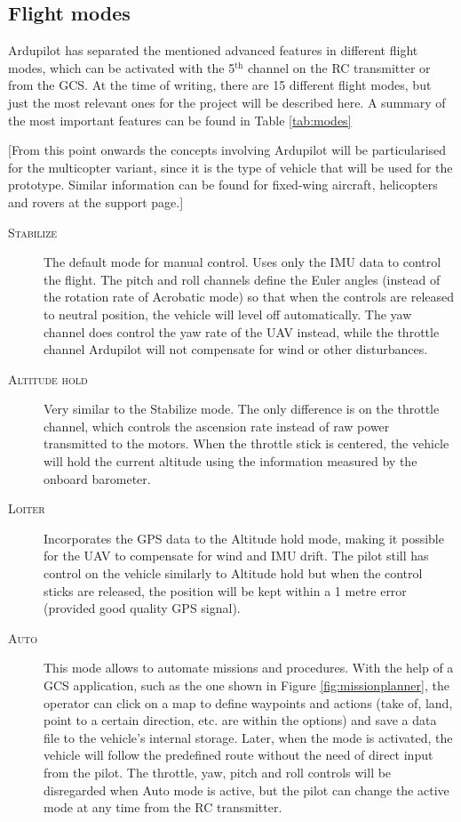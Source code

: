 \subsection{Flight modes}

Ardupilot has separated the mentioned advanced features in different flight modes, which can be activated with the 5$^{\text{th}}$ channel on the RC transmitter or from the GCS.
At the time of writing, there are 15 different flight modes, but just the most relevant ones for the project will be described here.
A summary of the most important features can be found in Table \ref{tab:modes}

\noindent \small{[From this point onwards the concepts involving Ardupilot will be particularised for the multicopter variant, since it is the type of vehicle that will be used for the prototype.
Similar information can be found for fixed-wing aircraft, helicopters and rovers at the support page.]

\begin{description}

	\item[\scshape Stabilize] 
		The default mode for manual control.
		Uses only the IMU data to control the flight.
		The pitch and roll channels define the Euler angles (instead of the rotation rate of Acrobatic mode) so that when the controls are released to neutral position, the vehicle will level off automatically.
		The yaw channel does control the yaw rate of the UAV instead, while the throttle channel
		Ardupilot will not compensate for wind or other disturbances.

	\item[\scshape Altitude hold]
		Very similar to the Stabilize mode.
		The only difference is on the throttle channel, which controls the ascension rate instead of raw power transmitted to the motors.
		When the throttle stick is centered, the vehicle will hold the current altitude using the information measured by the onboard barometer.

	\item[\scshape Loiter]
		Incorporates the GPS data to the Altitude hold mode, making it possible for the UAV to compensate for wind and IMU drift.
		The pilot still has control on the vehicle similarly to Altitude hold but when the control sticks are released, the position will be kept within a 1 metre error (provided good quality GPS signal).

	\item[\scshape Auto]
		This mode allows to automate missions and procedures.
		With the help of a GCS application, such as the one shown in Figure \ref{fig:missionplanner}, the operator can click on a map to define waypoints and actions (take of, land, point to a certain direction, etc. are within the options) and save a data file to the vehicle's internal storage.
		Later, when the mode is activated, the vehicle will follow the predefined route without the need of direct input from the pilot.
		The throttle, yaw, pitch and roll controls will be disregarded when Auto mode is active, but the pilot can change the active mode at any time from the RC transmitter.


\end{description}}
